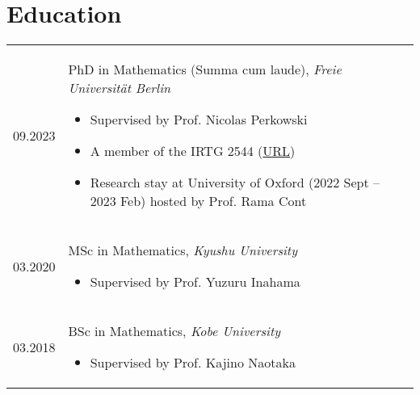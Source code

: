 \documentclass[12pt]{article}
\begin{document}
\section{Education}
\begin{tabular}{p{2.5cm} l}
    \rule{0pt}{0ex} 
    09.2023 & 
    \begin{minipage}[t]{0.8\textwidth}
    PhD in Mathematics (Summa cum laude), \emph{Freie Universität Berlin} 
    \begin{itemize}[leftmargin=*]
        \renewcommand\labelitemi{--}
        \setlength\itemsep{1ex}
        \setlength{\parskip}{0pt}
        \setlength{\parsep}{0pt}
        \setlength{\baselineskip}{0pt}
        \item  Supervised by Prof. Nicolas Perkowski
        \item  A member of the IRTG 2544 (\href{https://www3.math.tu-berlin.de/stoch/IRTG/}{URL})
        \item Research stay at University of Oxford (2022 Sept -- 2023 Feb) hosted by Prof. Rama Cont
    \end{itemize}
    \end{minipage}
    \\
    \rule{0pt}{4ex} 
    03.2020 & 
    \begin{minipage}[t]{0.8\textwidth}
    MSc in Mathematics, \emph{Kyushu University} 
    \begin{itemize}[leftmargin=*]
        \renewcommand\labelitemi{--}
        \setlength\itemsep{1ex}
        \setlength{\parskip}{0pt}
        \setlength{\parsep}{0pt}
        \setlength{\baselineskip}{0pt}
        \item  Supervised by Prof. Yuzuru Inahama 
    \end{itemize}
    \end{minipage}
    \\
    \rule{0pt}{4ex} 
    03.2018 & 
    \begin{minipage}[t]{0.8\textwidth}
    BSc in Mathematics, \emph{Kobe University} 
    \begin{itemize}[leftmargin=*]
        \renewcommand\labelitemi{--}
        \setlength\itemsep{1ex}
        \setlength{\parskip}{0pt}
        \setlength{\parsep}{0pt}
        \setlength{\baselineskip}{0pt}
        \item  Supervised by Prof. Kajino Naotaka 
    \end{itemize}
    \end{minipage}
\end{tabular}
\end{document}
